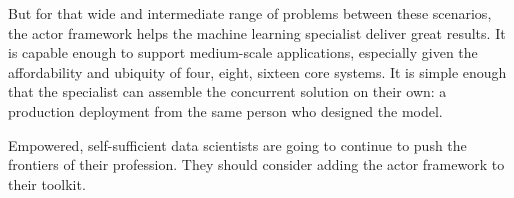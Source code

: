 \documentclass[tablecaption=bottom,wcp]{jmlr}
\begin{document}
But for that wide and intermediate range of problems between these 
scenarios, the actor framework helps the machine learning specialist
deliver great results. It is capable enough to support medium-scale
applications, especially given the affordability and ubiquity of four, eight, 
sixteen core systems. It is simple enough that the specialist can assemble the
concurrent solution on their own: a production deployment from the same
person who designed the model.

Empowered, self-sufficient data scientists are going to continue to push the 
frontiers of their profession. They should consider adding the actor 
framework to their toolkit.



\end{document}
